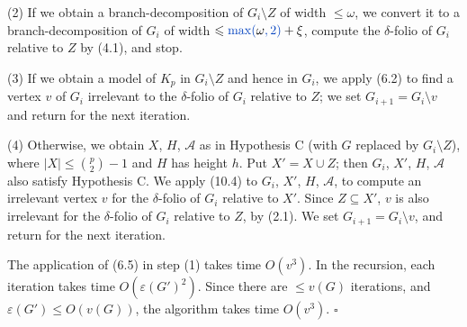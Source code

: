 \hspace*{12pt}(2) If we obtain a branch-decomposition of $G_i \setminus Z$ of width $\le \omega$, we convert it to a branch-decomposition of $G_i$ of width $\le \fix{\max(}\omega\fix{, 2)} + \xi$, compute the $\delta$-folio of $G_i$ relative to $Z$ by (4.1), and stop.

\hspace*{12pt}(3) If we obtain a model of $K_p$ in $G_i \setminus Z$ and hence in $G_i$, we apply (6.2) to find a vertex $v$ of $G_i$ irrelevant to the $\delta$-folio of $G_i$ relative to $Z$; we set $G_{i+1} = G_i \setminus v$ and return for the next iteration.

\hspace*{12pt}(4) Otherwise, we obtain $X$, $H$, $\mathcal{A}$ as in Hypothesis C (with $G$ replaced by $G_i \setminus Z$), where $|X| \le \binom{p}{2} - 1$ and $H$ has height $h$. Put $X' = X \cup Z$; then $G_i$, $X'$, $H$, $\mathcal{A}$ also satisfy Hypothesis C. We apply (10.4) to $G_i$, $X'$, $H$, $\mathcal{A}$, to compute an irrelevant vertex $v$ for the $\delta$-folio of $G_i$ relative to $X'$. Since $Z \subseteq X'$, $v$ is also irrelevant for the $\delta$-folio of $G_i$ relative to $Z$, by (2.1). We set $G_{i+1} = G_i \setminus v$, and return for the next iteration.

The application of (6.5) in step (1) takes time $O(v^3)$. In the recursion, each iteration takes time $O(\varepsilon(G')^2)$. Since there are $\le v(G)$ iterations, and $\varepsilon(G') \le O(v(G))$, the algorithm takes time $O(v^3)$. $\square$

